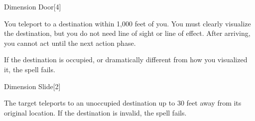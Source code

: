 \begin{spellsection}{Dimension Door}[4]
    \begin{spellheader}
    \end{spellheader}
    \begin{spellcontent}
        \begin{spelltargetinginfo}
        \end{spelltargetinginfo}
        \begin{spelleffects}
            \spelleffect You teleport to a destination within 1,000 feet of you. You must clearly visualize the destination, but you do not need line of sight or line of effect. After arriving, you cannot act until the next action phase.

            If the destination is occupied, or dramatically different from how you visualized it, the spell fails.
        \end{spelleffects}
    \end{spellcontent}
    \begin{spellfooter}
        \miscastexplode
    \end{spellfooter}
    \begin{spellaugments}
    \end{spellaugments}
\end{spellsection}

\begin{spellsection}{Dimension Slide}[2]
    \begin{spellheader}
    \end{spellheader}
    \begin{spellcontent}
        \begin{spelltargetinginfo}
        \end{spelltargetinginfo}
        \begin{spelleffects}
            \spelleffect The target teleports to an unoccupied destination up to 30 feet away from its original location. If the destination is invalid, the spell fails.
        \end{spelleffects}
    \end{spellcontent}
    \begin{spellfooter}
        \miscastrandom
    \end{spellfooter}
    \begin{spellaugments}
    \end{spellaugments}
\end{spellsection}

